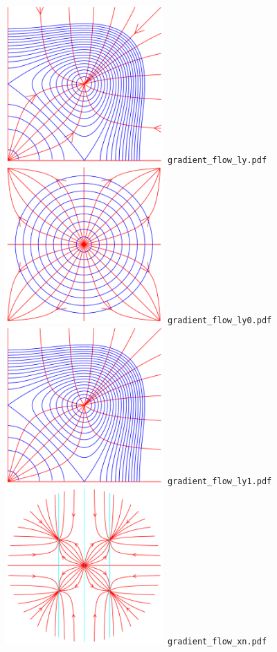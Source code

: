 \documentclass[a4paper]{amsart}
\begin{document}
\includegraphics[width=6cm]{gradient_flow_ly.pdf}\verb+ gradient_flow_ly.pdf+\\
\includegraphics[width=6cm]{gradient_flow_ly0.pdf}\verb+ gradient_flow_ly0.pdf+\\
\includegraphics[width=6cm]{gradient_flow_ly1.pdf}\verb+ gradient_flow_ly1.pdf+\\
\includegraphics[width=6cm]{gradient_flow_xn.pdf}\verb+ gradient_flow_xn.pdf+\\
\end{document}
